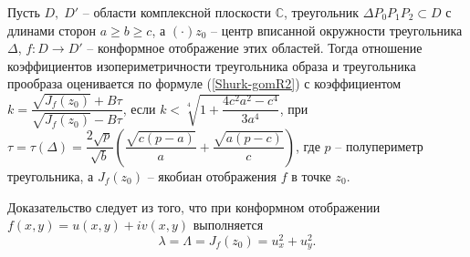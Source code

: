 \documentclass[a4paper,11pt,twoside]{article}
\begin{document}
\begin{crl}
Пусть $D, \; D'$ -- области комплексной плоскости $\mathbb{C}$, треугольник $\Delta P_0P_1P_2 \subset D$ с длинами сторон $a \geqslant b \geqslant c$, а $(\cdot) z_0 $ -- центр вписанной окружности треугольника %
$ \Delta $, $ f:D\rightarrow D'$ -- конформное  отображение этих областей.
Тогда отношение коэффициентов изопериметричности треугольника образа и треугольника прообраза оценивается по формуле (\ref{Shurk-gomR2}) с коэффициентом 
$k=\dfrac{\sqrt{J_f(z_0)}+ B \tau} {\sqrt{J_f(z_0)}- B \tau}$, если $k<\sqrt[4]{1+\dfrac{4c^2a^2-c^4}{3a^4}}$, при $\tau=\tau(\Delta)=\dfrac{2 \sqrt{p}}{\sqrt{b}}\left( \dfrac{\sqrt{c(p-a)}}{a} + \dfrac{\sqrt{a(p-c)}}{c} \right)$, где $p$ -- полупериметр треугольника, а $J_f(z_0)$ -- якобиан отображения $f$ в точке $z_0$.
\end{crl}

Доказательство следует из того, что при конформном отображении $f(x,y)=u(x,y)+iv(x,y)$ выполняется 
$$\lambda = \Lambda=J_f (z_0)=u_x^2+u_y^2.$$
\end{document}
